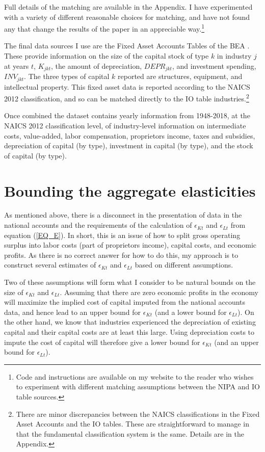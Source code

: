 \documentclass[11pt]{article}
\begin{document}
Full details of the matching are available in the Appendix. I have experimented with a variety of different reasonable choices for matching, and have not found any that change the results of the paper in an appreciable way.\footnote{Code and instructions are available on my website to the reader who wishes to experiment with different matching assumptions between the NIPA and IO table sources.}

The final data sources I use are the Fixed Asset Accounts Tables of the BEA \citep{beacap,beagov}. These provide information on the size of the capital stock of type $k$ in industry $j$ at years $t$, $K_{jkt}$, the amount of depreciation, $DEPR_{jkt}$, and investment spending, $INV_{jkt}$. The three types of capital $k$ reported are structures, equipment, and intellectual property. This fixed asset data is reported according to the NAICS 2012 classification, and so can be matched directly to the IO table industries.\footnote{There are minor discrepancies between the NAICS classifications in the Fixed Asset Accounts and the IO tables. These are straightforward to manage in that the fundamental classification system is the same. Details are in the Appendix.} 

Once combined the dataset contains yearly information from 1948-2018, at the NAICS 2012 classification level, of industry-level information on intermediate costs, value-added, labor compensation, proprietors income, taxes and subsidies, depreciation of capital (by type), investment in capital (by type), and the stock of capital (by type).

\section{Bounding the aggregate elasticities}\label{SEC_bounding}
As mentioned above, there is a disconnect in the presentation of data in the national accounts and the requirements of the calculation of $\epsilon_{Kt}$ and $\epsilon_{Lt}$ from equation (\ref{EQ_E}). In short, this is an issue of how to split gross operating surplus into labor costs (part of proprietors income), capital costs, and economic profits. As there is no correct answer for how to do this, my approach is to construct several estimates of $\epsilon_{Kt}$ and $\epsilon_{Lt}$ based on different assumptions.

Two of these assumptions will form what I consider to be natural bounds on the size of $\epsilon_{Kt}$ and $\epsilon_{Lt}$. Assuming that there are zero economic profits in the economy will maximize the implied cost of capital imputed from the national accounts data, and hence lead to an upper bound for $\epsilon_{Kt}$ (and a lower bound for $\epsilon_{Lt}$). On the other hand, we know that industries experienced the depreciation of existing capital and their capital costs are at least this large. Using depreciation costs to impute the cost of capital will therefore give a lower bound for $\epsilon_{Kt}$ (and an upper bound for $\epsilon_{Lt}$). 
\end{document}
